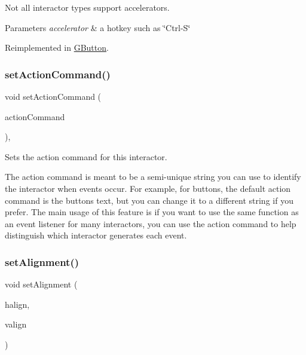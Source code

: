 Not all interactor types support accelerators. 
\begin{DoxyParams}{Parameters}
{\em accelerator} & a hotkey such as \char`\"{}\+Ctrl-\/\+S\char`\"{} \\
\hline
\end{DoxyParams}


Reimplemented in \mbox{\hyperlink{classGButton_a5f78fc506a33b57dced42a419be34446}{G\+Button}}.

\mbox{\label{classGInteractor_a4b5843fe3030e038a1ba54cc03389bcf}} 
\subsubsection{\texorpdfstring{set\+Action\+Command()}{setActionCommand()}}
{\footnotesize\ttfamily void set\+Action\+Command (\begin{DoxyParamCaption}\item[{const std\+::string \&}]{action\+Command }\end{DoxyParamCaption})\hspace{0.3cm}{\ttfamily [virtual]}, {\ttfamily [inherited]}}



Sets the action command for this interactor. 

The action command is meant to be a semi-\/unique string you can use to identify the interactor when events occur. For example, for buttons, the default action command is the button\textquotesingle{}s text, but you can change it to a different string if you prefer. The main usage of this feature is if you want to use the same function as an event listener for many interactors, you can use the action command to help distinguish which interactor generates each event. \mbox{\label{classGContainer_a0bcf8805d87afc9bb4c6ca238ca7c0bd}} 
\subsubsection{\texorpdfstring{set\+Alignment()}{setAlignment()}}
{\footnotesize\ttfamily void set\+Alignment (\begin{DoxyParamCaption}\item[{Horizontal\+Alignment}]{halign,  }\item[{Vertical\+Alignment}]{valign }\end{DoxyParamCaption})\hspace{0.3cm}{\ttfamily [virtual]}}



